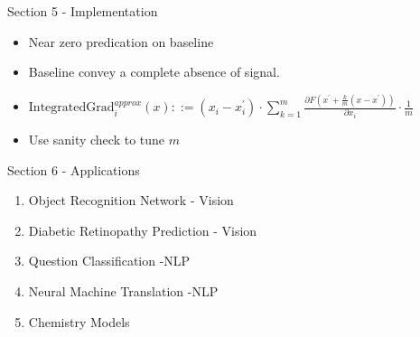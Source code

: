 \documentclass[serif]{beamer}
\begin{document}
\begin{frame}{Section 5 - Implementation}
	\begin{itemize}
		\item Near zero predication on baseline 
		\item Baseline convey a complete absence of signal.
		\item $\text{IntegratedGrad}_i^{approx}(x)::= (x_i - x_i^\prime) \cdot \sum_{k=1}^m \frac{\partial F(x^\prime + \frac{k}{m}(x-x^\prime))}{\partial x_i}  \cdot \frac{1}{m}$
		\item Use sanity check to tune $m$
	\end{itemize}
\end{frame}

\begin{frame}{Section 6 - Applications}
	\begin{enumerate}
		\item Object Recognition Network - Vision
		\item Diabetic Retinopathy Prediction - Vision
		\item Question Classification -NLP
		\item Neural Machine Translation -NLP
		\item Chemistry Models
	\end{enumerate}
\end{frame}
\end{document}
